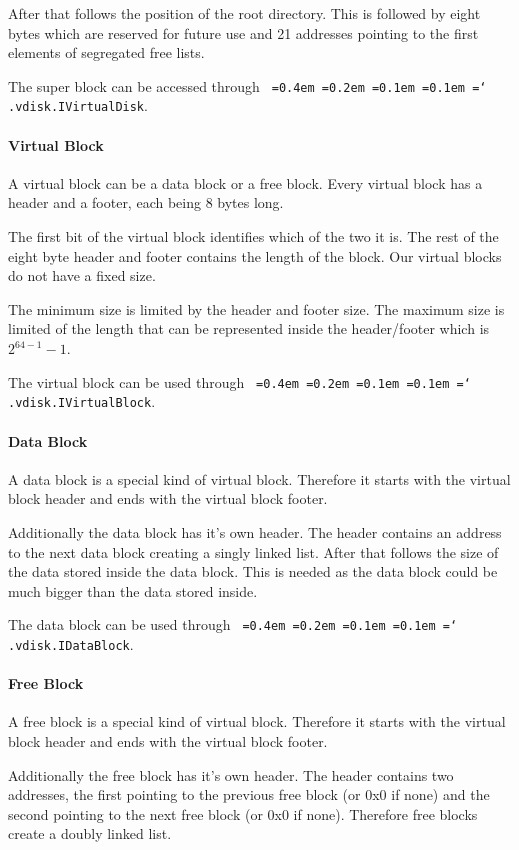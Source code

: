 \documentclass[a4paper,12pt]{article}
\newcommand*\justify{%
  \fontdimen2\font=0.4em%
  \fontdimen3\font=0.2em%
  \fontdimen4\font=0.1em%
  \fontdimen7\font=0.1em%
  \hyphenchar\font=`\-%
}
\newcommand{\package}[1]{\texttt{\justify #1}}
\begin{document}
After that follows the position of the root directory. This is followed by eight bytes which are reserved for future use and 21 addresses pointing to the first elements of segregated free lists.

The super block can be accessed through \package{.vdisk.IVirtualDisk}.

\paragraph{Virtual Block}
A virtual block can be a data block or a free block. Every virtual block has a header and a footer, each being 8 bytes long.

The first bit of the virtual block identifies which of the two it is. The rest of the eight byte header and footer contains the length of the block. Our virtual blocks do not have a fixed size.

The minimum size is limited by the header and footer size. The maximum size is limited of the length that can be represented inside the header/footer which is $2^{64-1} - 1$.

The virtual block can be used through \package{.vdisk.IVirtualBlock}.

\paragraph{Data Block}
A data block is a special kind of virtual block. Therefore it starts with the virtual block header and ends with the virtual block footer.

Additionally the data block has it's own header. The header contains an address to the next data block creating a singly linked list. After that follows the size of the data stored inside the data block. This is needed as the data block could be much bigger than the data stored inside.

The data block can be used through \package{.vdisk.IDataBlock}.

\paragraph{Free Block}
A free block is a special kind of virtual block. Therefore it starts with the virtual block header and ends with the virtual block footer.

Additionally the free block has it's own header. The header contains two addresses, the first pointing to the previous free block (or 0x0 if none) and the second pointing to the next free block (or 0x0 if none). Therefore free blocks create a doubly linked list.
\end{document}
